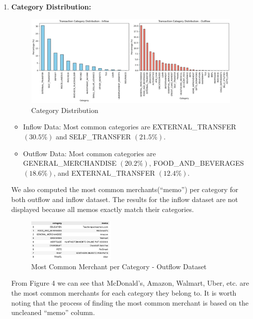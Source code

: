 \documentclass[12pt,letterpaper]{article}
\begin{document}
\begin{enumerate}
    \item{\textbf{Category Distribution:}}
    \begin{figure}[H]
        \centering
        \includegraphics[width=1.0\textwidth]{pngs/category_dist.png}
        \caption{Category Distribution}
        \label{fig:enter-label}
    \end{figure}
    \begin{itemize}
        \item Inflow Data: Most common categories are EXTERNAL\_TRANSFER $(30.5\%)$ and SELF\_TRANSFER $(21.5\%)$.
        \item Outflow Data: Most common categories are GENERAL\_MERCHANDISE $(20.2\%)$, FOOD\_AND\_BEVERAGES $(18.6\%)$, and EXTERNAL\_TRANSFER $(12.4\%)$.
    \end{itemize}

    {We also computed the most common merchants(“memo”) per category for both outflow and inflow dataset. The results for the inflow dataset are not displayed because all memos exactly match their categories.}
    \begin{figure}[H]
        \centering
        \includegraphics[width=0.4\textwidth]{pngs/cmn_merchant.png}
        \caption{Most Common Merchant per Category - Outflow Dataset}
        \label{fig:enter-label}
    \end{figure}
    {From Figure 4 we can see that McDonald’s, Amazon, Walmart, Uber, etc. are the most common merchants for each category they belong to. It is worth noting that the process of finding the most common merchant is based on the uncleaned “memo” column.}
\end{enumerate}
\end{document}
